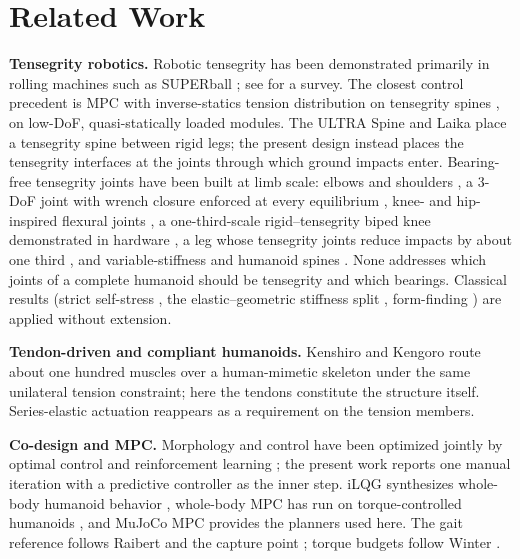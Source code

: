\documentclass[letterpaper, 10pt, conference]{ieeeconf}
\begin{document}
\section{Related Work}
\label{sec:related}
\textbf{Tensegrity robotics.} Robotic tensegrity
\cite{fuller1962patent,snelson1965patent,skelton2009tensegrity} has been
demonstrated primarily in rolling machines such as SUPERball
\cite{sabelhaus2015superball,caluwaerts2014design}; see
\cite{shah2022tensegrity} for a survey. The closest control precedent is
MPC with inverse-statics tension distribution on tensegrity spines
\cite{sabelhaus2018spinempc}, on low-DoF, quasi-statically loaded modules.
The ULTRA Spine \cite{sabelhaus2015ultra} and Laika \cite{sabelhaus2018laika}
place a tensegrity spine between rigid legs; the present design instead
places the tensegrity interfaces at the joints through which ground
impacts enter. Bearing-free tensegrity joints have been built at limb scale: elbows
and shoulders \cite{lessard2016manipulator}, a 3-DoF joint with wrench
closure enforced at every equilibrium \cite{friesen2018joint}, knee- and
hip-inspired flexural joints \cite{jung2018flexural}, a one-third-scale
rigid--tensegrity biped knee demonstrated in hardware \cite{wen2025knee},
a leg whose tensegrity joints reduce impacts by about one third
\cite{mortensen2025leg}, and variable-stiffness and humanoid spines
\cite{zappetti2020spine,ali2025spine}. None addresses which joints of a
complete humanoid should be tensegrity and which bearings. Classical results (strict self-stress \cite{calladine1978tensegrity},
the elastic--geometric stiffness split \cite{guest2006stiffness},
form-finding \cite{tibert2003form}) are applied without extension.

\textbf{Tendon-driven and compliant humanoids.} Kenshiro \cite{nakanishi2013kenshiro} and Kengoro
\cite{asano2017kengoro} route about one hundred muscles over a
human-mimetic skeleton under the same unilateral tension constraint; here
the tendons constitute the structure itself. Series-elastic actuation
\cite{pratt1995series,tsagarakis2013coman} reappears as a requirement on
the tension members.

\textbf{Co-design and MPC.} Morphology and control have been optimized
jointly by optimal control \cite{ha2018codesign} and reinforcement learning
\cite{schaff2019jointly}; the present work reports one manual iteration
with a predictive controller as the inner step. iLQG synthesizes whole-body humanoid behavior
\cite{tassa2012synthesis,tassa2014control}, whole-body MPC has run on
torque-controlled humanoids \cite{koenemann2015whole,dantec2022whole}, and
MuJoCo MPC \cite{howell2022mjpc} provides the planners used here. The gait
reference follows Raibert \cite{raibert1986legged} and the capture point
\cite{pratt2006capture}; torque budgets follow Winter
\cite{winter2009biomechanics}.
\end{document}
